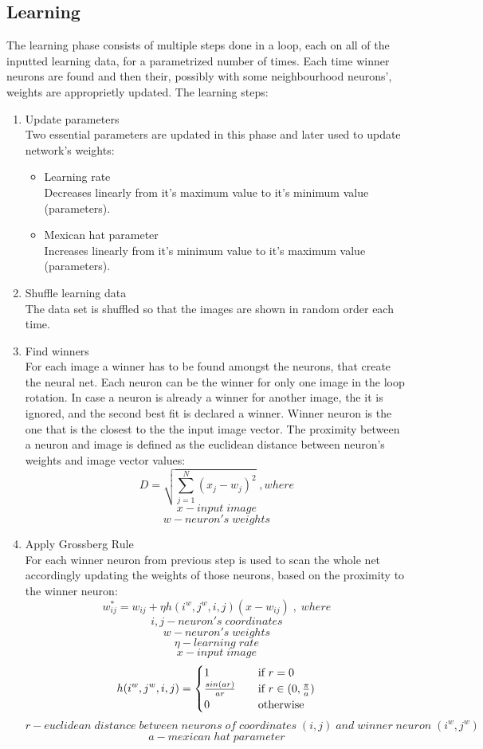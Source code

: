 \documentclass[pdftex]{article}
\begin{document}
\subsection{Learning}
The learning phase consists of multiple steps done in a loop, each on all of the inputted learning data, for a parametrized number of times. Each time winner neurons are found and then their, possibly with some neighbourhood neurons', weights are approprietly updated. The learning steps:
\begin{enumerate}
\item{Update parameters} \\
Two essential parameters are updated in this phase and later used to update network's weights:
\begin{itemize}
\item{Learning rate} \\
Decreases linearly from it's maximum value to it's minimum value (parameters).
\item{Mexican hat parameter} \\
Increases linearly from it's minimum value to it's maximum value (parameters).
\end{itemize}
\item{Shuffle learning data} \\
The data set is shuffled so that the images are shown in random order each time.
\item{Find winners} \\
For each image a winner has to be found amongst the neurons, that create the neural net. Each neuron can be the winner for only one image in the loop rotation. In case a neuron is already a winner for another image, the it is ignored, and the second best fit is declared a winner. Winner neuron is the one that is the closest to the the input image vector. The proximity between a neuron and image is defined as the euclidean distance between neuron's weights and image vector values:
$$ D = \sqrt{\sum_{j=1}^{N} (x_j-w_j)^2} \;, where $$
$$ x-input\; image $$
$$ w-neuron's\; weights $$
\item{Apply Grossberg Rule} \\
For each winner neuron from previous step is used to scan the whole net accordingly updating the weights of those neurons, based on the proximity to the winner neuron:
$$ w_{ij}^* = w_{ij} +  \eta  h(i^w, j^w, i, j)(x - w_{ij}) \; , \; where $$
$$  i,j-neuron's \; coordinates $$
$$  w-neuron's\; weights $$
$$ \eta-learning\; rate $$
$$ x-input\; image $$
$$ h(i^w, j^w, i, j) =
 \begin{cases}
 1  			& \quad \text{if } r=0\\
 sin(ar) \over ar 	& \quad \text{if } r \in ({0, {\pi \over a}})\\
 0  			& \quad \text{otherwise} \\
  \end{cases}$$
$$ r-euclidean \; distance \; between \; neurons \; of \; coordinates \; (i,j) \; and \; winner \; neuron \; (i^w,j^w) $$
$$ a-mexican \; hat \; parameter$$
\end{enumerate}
\end{document}
